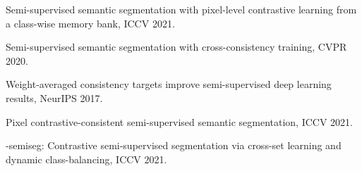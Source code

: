 \documentclass[10pt,twocolumn,letterpaper]{article}
\begin{document}
\begin{table}
\centering
\vspace{-1mm}
 \vspace{-3mm}
\caption{
Performance of different loss combinations in mIoU. 
} \label{sec:loss-ablation} 
\vspace{-6mm}
\end{table}
 


\scriptsize{
    \begin{enumerate}[label={[\arabic*]},itemsep=-1.5mm,leftmargin=5mm]
      \item Semi-supervised semantic segmentation with pixel-level contrastive learning from a class-wise memory bank, ICCV 2021.
      \item Semi-supervised semantic segmentation with cross-consistency training, CVPR 2020.
      \item Weight-averaged consistency targets improve semi-supervised deep learning results, NeurIPS 2017.
      \item Pixel contrastive-consistent semi-supervised semantic segmentation, ICCV 2021.
      \item -semiseg: Contrastive semi-supervised segmentation via cross-set learning and dynamic class-balancing, ICCV 2021.
    \end{enumerate}
}
\end{document}
